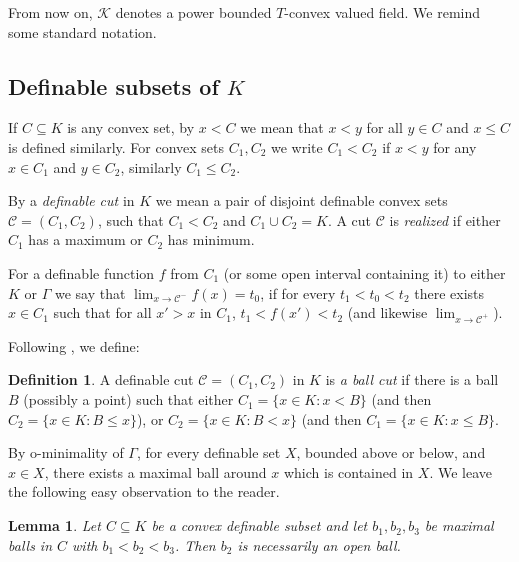 \documentclass[11pt]{amsart}
\newtheorem{lemma}[theorem]{Lemma}
\theoremstyle{definition}
\newtheorem{definition}[theorem]{Definition}
\newcommand{\CK}{{\mathcal K}}
\newcommand{\CC}{{\mathcal C}}
\newcommand{\0}{\emptyset}
\begin{document}
From now on, $\CK$ denotes a power bounded $T$-convex valued field. We remind some standard notation. 

\subsection{Definable subsets of $K$}
If $C\subseteq K$ is any convex set, by $x<C$ we mean that $x<y$ for all $y\in C$ and  $x\leq C$ is defined similarly. For convex sets $C_1, C_2$ we write  $C_1<C_2$ if $x<y$ for any $x\in C_1$ and $y\in C_2$, similarly $C_1\leq C_2$.


By a \emph{definable cut} in $K$ we mean a pair of disjoint definable convex sets $\CC=(C_1,C_2)$, such that $C_1<C_2$ and $C_1\cup C_2=K$. A cut  $\CC$ is \emph{realized} if either $C_1$ has a maximum or $C_2$ has minimum.


For a definable function $f$ from $C_1$ (or some open interval containing it) to either $K$ or $\Gamma$ we say that  $\lim_{x\to \CC^-}f(x)=t_0$, if for every $t_1<t_0<t_2$  there exists $x\in C_1$ such that for all $x'>x$ in $C_1$, $t_1<f(x')<t_2$ (and likewise $\lim_{x\to \CC^+}$). 

Following \cite{holly}, we define: 
\begin{definition}
    A definable cut $\CC=(C_1,C_2)$ in $K$ is {\em a ball cut} if there is a  ball $B$ (possibly a point) such that either $C_1=\{x\in K: x<B\}$ (and then $C_2=\{x\in K: B\leq x\}$), or $C_2=\{x\in K: B<x\}$ (and then $C_1=\{x\in K: x\leq B\}$.
\end{definition}

By o-minimality of $\Gamma$, for every definable set $X$, bounded above or below, and $x\in X$,  there exists a maximal ball around $x$ which is contained in $X$. We leave the following easy observation to the reader.

\begin{lemma}\label{L:at most two closed max balls}
    Let $C\subseteq K$ be a convex definable subset and let $b_1,b_2,b_3$ be maximal balls in $C$ with $b_1<b_2<b_3$. Then $b_2$ is necessarily an open ball.
\end{lemma}
\end{document}
